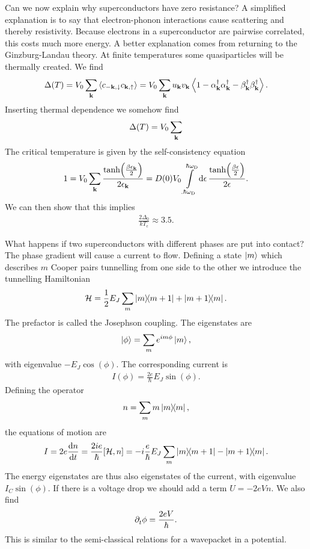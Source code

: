 Can we now explain why superconductors have zero resistance? A simplified explanation is to say that electron-phonon interactions cause scattering and thereby resistivity. Because electrons in a superconductor are pairwise correlated, this costs much more energy. A better explanation comes from returning to the Ginzburg-Landau theory. At finite temperatures some quasiparticles will be thermally created. We find
\begin{align*}
	\Delta(T) = V_{0}\sum\limits_{\vb{k}}\expval{c_{-\vb{k}, \downarrow}c_{\vb{k}, \uparrow}} = V_{0}\sum\limits_{\vb{k}}u_{\vb{k}}v_{\vb{k}}\expval{1 - \alpha_{\vb{k}}\ensuremath{^{\dagger}}\alpha_{\vb{k}}\ensuremath{^{\dagger}}- \beta_{\vb{k}}\ensuremath{^{\dagger}}\beta_{\vb{k}}\ensuremath{^{\dagger}}}.
\end{align*}
Inserting thermal dependence we somehow find
\begin{align*}
	\Delta(T) = V_{0}\sum\limits_{\vb{k}}
\end{align*}
The critical temperature is given by the self-consistency equation
\begin{align*}
	1 = V_{0}\sum\limits_{\vb{k}}\frac{\tanh(\frac{\beta\epsilon_{\vb{k}}}{2})}{2\epsilon_{\vb{k}}} = D(0)V_{0}\int\limits_{.\hbar\omega_{\text{D}}}^{\hbar\omega_{\text{D}}}\dd{\epsilon}\frac{\tanh(\frac{\beta\epsilon}{2})}{2\epsilon}.
\end{align*}
We can then show that this implies
\begin{align*}
	\frac{2\Delta_{0}}{kT_{\text{c}}} \approx 3.5.
\end{align*}

What happens if two superconductors with different phases are put into contact? The phase gradient will cause a current to flow. Defining a state $\ket{m}$ which describes $m$ Cooper pairs tunnelling from one side to the other we introduce the tunnelling Hamiltonian
\begin{align*}
	\mathcal{H} = \frac{1}{2}E_{J}\sum\limits_{m}\op{m}{m + 1} + \op{m + 1}{m}.
\end{align*}
The prefactor is called the Josephson coupling. The eigenstates are
\begin{align*}
	\ket{\phi} = \sum\limits_{m}e^{im\phi}\ket{m},
\end{align*}
with eigenvalue $-E_{J}\cos(\phi)$. The corresponding current is
\begin{align*}
	I(\phi) = \frac{2e}{\hbar}E_{J}\sin(\phi).
\end{align*}
Defining the operator
\begin{align*}
	n = \sum\limits_{m}m\op{m},
\end{align*}
the equations of motion are
\begin{align*}
	I = 2e\dv{n}{t} = \frac{2ie}{\hbar}\comm{\ham}{n} = -i\frac{e}{\hbar}E_{J}\sum\limits_{m}\op{m}{m + 1} - \op{m + 1}{m}.
\end{align*}
The energy eigenstates are thus also eigenstates of the current, with eigenvalue $I_{C}\sin(\phi)$. If there is a voltage drop we should add a term $U = -2eVn$. We also find
\begin{align*}
	\partial^{}_{t}\phi = \frac{2eV}{\hbar}.
\end{align*}
This is similar to the semi-classical relations for a wavepacket in a potential.

